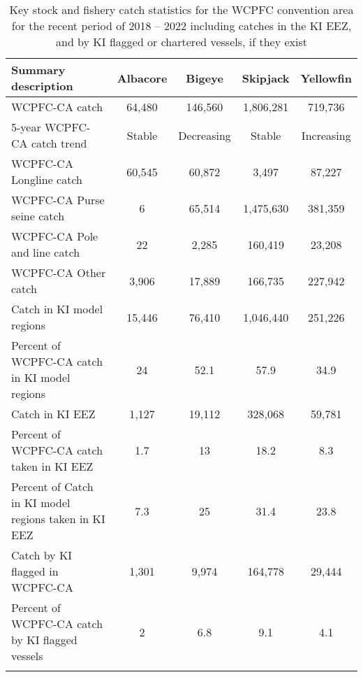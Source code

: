 \begin{longtable}{lcccc}
\caption{Key stock and fishery catch statistics for the WCPFC convention area for the recent period of 2018 -- 2022 including catches in the KI EEZ, and by KI flagged or chartered vessels, if they exist} \\ 
  \hline
Summary description & Albacore & Bigeye & Skipjack & Yellowfin \\ 
  \hline
WCPFC-CA catch & 64,480 & 146,560 & 1,806,281 & 719,736 \\ 
  5-year WCPFC-CA catch trend & Stable & Decreasing & Stable & Increasing \\ 
  WCPFC-CA Longline catch & 60,545 & 60,872 & 3,497 & 87,227 \\ 
  WCPFC-CA Purse seine catch & 6 & 65,514 & 1,475,630 & 381,359 \\ 
  WCPFC-CA Pole and line catch & 22 & 2,285 & 160,419 & 23,208 \\ 
  WCPFC-CA Other catch & 3,906 & 17,889 & 166,735 & 227,942 \\ 
  Catch in KI model regions & 15,446 & 76,410 & 1,046,440 & 251,226 \\ 
  Percent of WCPFC-CA catch in KI model regions & 24 & 52.1 & 57.9 & 34.9 \\ 
   \hline
Catch in KI EEZ & 1,127 & 19,112 & 328,068 & 59,781 \\ 
  Percent of WCPFC-CA catch taken in KI EEZ & 1.7 & 13 & 18.2 & 8.3 \\ 
  Percent of Catch in KI model regions taken in KI EEZ & 7.3 & 25 & 31.4 & 23.8 \\ 
  Catch by KI flagged in WCPFC-CA & 1,301 & 9,974 & 164,778 & 29,444 \\ 
  Percent of WCPFC-CA catch by KI flagged vessels & 2 & 6.8 & 9.1 & 4.1 \\ 
  \hline
\label{cat_sum_tab}
\end{longtable}
